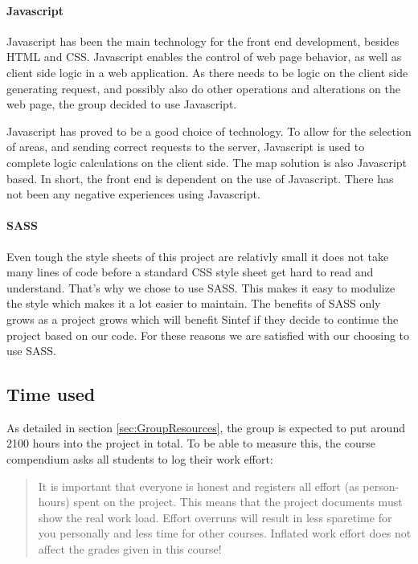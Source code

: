 \documentclass[11pt,a4paper,titlepage,oneside]{report}
\begin{document}
\paragraph{Javascript}
Javascript has been the main technology for the front end development, besides \gls{HTML} and \gls{CSS}. Javascript enables the control of web page behavior, as well as client side logic in a web application. As there needs to be logic on the client side generating request, and possibly also do other operations and alterations on the web page, the group decided to use Javascript. 

Javascript has proved to be a good choice of technology. To allow for the selection of areas, and sending correct requests to the server, Javascript is used to complete logic calculations on the client side. The map solution is also Javascript based. In short, the front end is dependent on the use of Javascript. There has not been any negative experiences using Javascript. 

\paragraph{SASS}
Even tough the style sheets of this project are relativly small it does not take many lines of code before a standard \gls{CSS} style sheet get hard to read and understand. That's why we chose to use \gls{SASS}. This makes it easy to modulize the style which makes it a lot easier to maintain. The benefits of \gls{SASS} only grows as a project grows which will benefit Sintef if they decide to continue the project based on our code. For these reasons we are satisfied with our choosing to use \gls{SASS}.

\subsection{Time used}
\label{subsec:TimeUsed}
As detailed in section \ref{sec:GroupResources}, the group is expected to put around 2100 hours into the project in total. To be able to measure this, the \gls{course compendium} asks all students to log their work effort:

\begin{quote}
It is important that everyone is honest and registers all effort (as person-hours) spent on the project. This means that the project documents must show the real work load. Effort overruns will result in less sparetime for you personally and less time for other courses. Inflated work effort does not affect the grades given in this course! \cite{TDT4290:Intro}
\end{quote}
\end{document}

